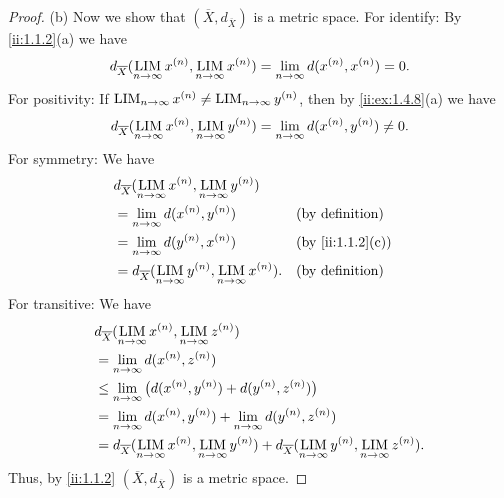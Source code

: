 \begin{proof}{(b)}
  Now we show that \((\overline{X}, d_{\overline{X}})\) is a metric space.
  For identify:
  By \cref{ii:1.1.2}(a) we have
  \[
    d_{\overline{X}}(\operatorname*{LIM}_{n \to \infty} x^{(n)}, \operatorname*{LIM}_{n \to \infty} x^{(n)}) = \lim_{n \to \infty} d(x^{(n)}, x^{(n)}) = 0.
  \]
  For positivity:
  If \(\operatorname*{LIM}_{n \to \infty} x^{(n)} \neq \operatorname*{LIM}_{n \to \infty} y^{(n)}\), then by \cref{ii:ex:1.4.8}(a) we have
  \[
    d_{\overline{X}}(\operatorname*{LIM}_{n \to \infty} x^{(n)}, \operatorname*{LIM}_{n \to \infty} y^{(n)}) = \lim_{n \to \infty} d(x^{(n)}, y^{(n)}) \neq 0.
  \]
  For symmetry:
  We have
  \begin{align*}
     & d_{\overline{X}}(\LIM_{n \to \infty} x^{(n)}, \LIM_{n \to \infty} y^{(n)})                                \\
     & = \lim_{n \to \infty} d(x^{(n)}, y^{(n)})                                     &  & \text{(by definition)} \\
     & = \lim_{n \to \infty} d(y^{(n)}, x^{(n)})                                     &  & \by{ii:1.1.2}[c]       \\
     & = d_{\overline{X}}(\LIM_{n \to \infty} y^{(n)}, \LIM_{n \to \infty} x^{(n)}). &  & \text{(by definition)}
  \end{align*}
  For transitive:
  We have
  \begin{align*}
     & d_{\overline{X}}(\operatorname*{LIM}_{n \to \infty} x^{(n)}, \operatorname*{LIM}_{n \to \infty} z^{(n)})                                                                                 \\
     & = \lim_{n \to \infty} d(x^{(n)}, z^{(n)})                                                                                                                  \\
     & \leq \lim_{n \to \infty} \big(d(x^{(n)}, y^{(n)}) + d(y^{(n)}, z^{(n)})\big)                                                                               \\
     & = \lim_{n \to \infty} d(x^{(n)}, y^{(n)}) + \lim_{n \to \infty} d(y^{(n)}, z^{(n)})                                                                        \\
     & = d_{\overline{X}}(\operatorname*{LIM}_{n \to \infty} x^{(n)}, \operatorname*{LIM}_{n \to \infty} y^{(n)}) + d_{\overline{X}}(\operatorname*{LIM}_{n \to \infty} y^{(n)}, \operatorname*{LIM}_{n \to \infty} z^{(n)}).
  \end{align*}
  Thus, by \cref{ii:1.1.2} \((\overline{X}, d_{\overline{X}})\) is a metric space.
\end{proof}

